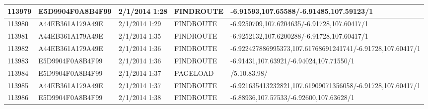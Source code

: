 \begin{longtable}{|p{1cm}|l|l|l|p{8cm}|}
113979         & E5D9904F0A8B4F99 & 2/1/2014 1:28            & FINDROUTE       & -6.91593,107.65588/-6.91485,107.59123/1                                                                                                                                                                               \\ \hline
113980         & A44EB361A179A49E & 2/1/2014 1:29            & FINDROUTE       & -6.9250709,107.6204635/-6.91728,107.60417/1                                                                                                                                                                           \\ \hline
113981         & A44EB361A179A49E & 2/1/2014 1:35            & FINDROUTE       & -6.9252132,107.6200288/-6.91728,107.60417/1                                                                                                                                                                           \\ \hline
113982         & A44EB361A179A49E & 2/1/2014 1:36            & FINDROUTE       & -6.922427886995373,107.61768691241741/-6.91728,107.60417/1                                                                                                                                                            \\ \hline
113983         & E5D9904F0A8B4F99 & 2/1/2014 1:36            & FINDROUTE       & -6.91431,107.63921/-6.94024,107.71550/1                                                                                                                                                                               \\ \hline
113984         & E5D9904F0A8B4F99 & 2/1/2014 1:37            & PAGELOAD        & /5.10.83.98/                                                                                                                                                                                                          \\ \hline
113985         & A44EB361A179A49E & 2/1/2014 1:37            & FINDROUTE       & -6.921635413232821,107.61909071356058/-6.91728,107.60417/1                                                                                                                                                            \\ \hline
113986         & E5D9904F0A8B4F99 & 2/1/2014 1:38            & FINDROUTE       & -6.88936,107.57533/-6.92600,107.63628/1                                                                                                                                                                               \\ \hline

\end{longtable}
